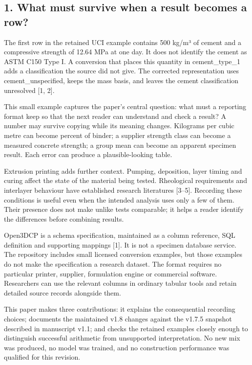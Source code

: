 \documentclass[
  american,
  11pt,
  letterpaper,
]{article}
\renewcommand{\texttt}[1]{{\ttfamily\fontsize{9.5}{11}\selectfont\hyphenchar\font=-1 #1}}
\begin{document}
\subsection{1. What must survive when a result becomes a
row?}\label{what-must-survive-when-a-result-becomes-a-row}

The first row in the retained UCI example contains 500 kg/m³ of cement
and a compressive strength of 12.64 MPa at one day. It does not identify
the cement as ASTM C150 Type I. A conversion that places this quantity
in \texttt{cement\_type\_1} adds a classification the source did not
give. The corrected representation uses \texttt{cement\_unspecified},
keeps the mass basis, and leaves the cement classification unresolved
{[}1, 2{]}.

This small example captures the paper's central question: what must a
reporting format keep so that the next reader can understand and check a
result? A number may survive copying while its meaning changes.
Kilograms per cubic metre can become percent of binder; a supplier
strength class can become a measured concrete strength; a group mean can
become an apparent specimen result. Each error can produce a
plausible-looking table.

Extrusion printing adds further context. Pumping, deposition, layer
timing and curing affect the state of the material being tested.
Rheological requirements and interlayer behaviour have established
research literatures {[}3--5{]}. Recording these conditions is useful
even when the intended analysis uses only a few of them. Their presence
does not make unlike tests comparable; it helps a reader identify the
differences before combining results.

Open3DCP is a schema specification, maintained as a column reference,
SQL definition and supporting mappings {[}1{]}. It is not a specimen
database service. The repository includes small licensed conversion
examples, but those examples do not make the specification a research
dataset. The format requires no particular printer, supplier,
formulation engine or commercial software. Researchers can use the
relevant columns in ordinary tabular tools and retain detailed source
records alongside them.

This paper makes three contributions: it explains the consequential
recording choices; documents the maintained v1.8 changes against the
v1.7.5 snapshot described in manuscript v1.1; and checks the retained
examples closely enough to distinguish successful arithmetic from
unsupported interpretation. No new mix was produced, no model was
trained, and no construction performance was qualified for this
revision.
\end{document}
